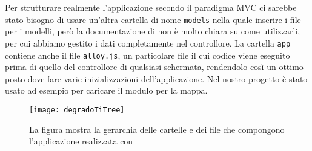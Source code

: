             \noindent Per strutturare realmente l'applicazione secondo il paradigma MVC
            ci sarebbe stato bisogno di usare un'altra cartella di nome \texttt{models}
            nella quale inserire i file \js{} per i modelli, però la documentazione
            di \tisdk{} non è molto chiara su come utilizzarli, per cui
            abbiamo gestito i dati completamente nel controllore.
            \noindent La cartella \texttt{app} contiene anche il file \texttt{alloy.js}, un particolare file
            \js{} il cui codice viene eseguito prima di quello del controllore
            di qualsiasi schermata, rendendolo così un ottimo posto dove fare
            varie inizializzazioni dell'applicazione. Nel nostro progetto è
            stato usato ad esempio per caricare il modulo per la mappa.
            
            \begin{figure}[H]
                \centering
                \texttt{[image: degradoTiTree]}
                \caption{
                La figura mostra la gerarchia delle cartelle e dei file che
                compongono l'applicazione realizzata con \tisdk{}
                }
                \label{fig:degradoTiTree}
            \end{figure}
            
